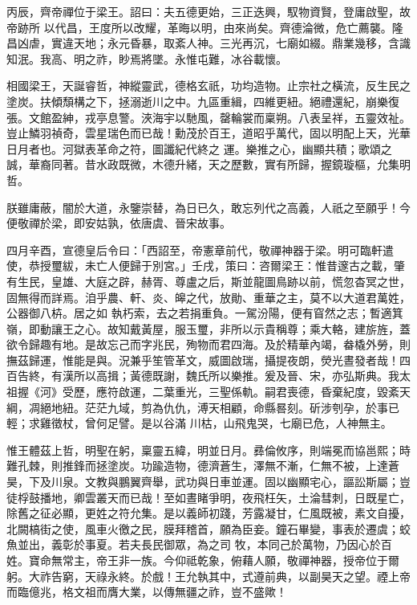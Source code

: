 \begin{pinyinscope}
 丙辰，齊帝禪位于梁王。詔曰：夫五德更始，三正迭興，馭物資賢，登庸啟聖，故帝跡所
 以代昌，王度所以改耀，革晦以明，由來尚矣。齊德淪微，危亡薦襲。隆昌凶虐，實違天地；永元昏暴，取紊人神。三光再沉，七廟如綴。鼎業幾移，含識知泯。我高、明之祚，眇焉將墜。永惟屯難，冰谷載懷。



 相國梁王，天誕睿哲，神縱靈武，德格玄祇，功均造物。止宗社之橫流，反生民之塗炭。扶傾頹構之下，拯溺逝川之中。九區重緝，四維更紐。絕禮還紀，崩樂復張。文館盈紳，戎亭息警。浹海宇以馳風，罄輪裳而稟朔。八表呈祥，五靈效祉。豈止鱗羽禎奇，雲星瑞色而已哉！勳茂於百王，道昭乎萬代，固以明配上天，光華日月者也。河獄表革命之符，圖讖紀代終之
 運。樂推之心，幽顯共積；歌頌之誠，華裔同著。昔水政既微，木德升緒，天之歷數，實有所歸，握鏡璇樞，允集明哲。



 朕雖庸蔽，闇於大道，永鑒崇替，為日已久，敢忘列代之高義，人祇之至願乎！今便敬禪於梁，即安姑孰，依唐虞、晉宋故事。



 四月辛酉，宣德皇后令曰：「西詔至，帝憲章前代，敬禪神器于梁。明可臨軒遣使，恭授璽紱，未亡人便歸于別宮。」壬戌，策曰：咨爾梁王：惟昔邃古之載，肇有生民，皇雄、大庭之辟，赫胥、尊盧之后，斯並龍圖鳥跡以前，慌忽杳冥之世，固無得而詳焉。洎乎農、軒、炎、皞之代，放勛、重華之主，莫不以大道君萬姓，公器御八枿。居之如
 執朽索，去之若捐重負。一駕汾陽，便有窅然之志；暫適箕嶺，即動讓王之心。故知戴黃屋，服玉璽，非所以示貴稱尊；乘大輅，建旂旌，蓋欲令歸趣有地。是故忘己而字兆民，殉物而君四海。及於精華內竭，畚橇外勞，則撫茲歸運，惟能是與。況兼乎笙管革文，威圖啟瑞，攝提夜朗，熒光晝發者哉！四百告終，有漢所以高揖；黃德既謝，魏氏所以樂推。爰及晉、宋，亦弘斯典。我太祖握《河》受歷，應符啟運，二葉重光，三聖係軌。嗣君喪德，昏棄紀度，毀紊天綱，凋絕地紐。茫茫九域，剪為仇仇，溥天相顧，命縣晷刻。斫涉刳孕，於事已輕；求雞徵杖，曾何足譬。是以谷滿
 川枯，山飛鬼哭，七廟已危，人神無主。



 惟王體茲上哲，明聖在躬，稟靈五緯，明並日月。彞倫攸序，則端冕而協邕熙；時難孔棘，則推鋒而拯塗炭。功踰造物，德濟蒼生，澤無不漸，仁無不被，上達蒼昊，下及川泉。文教與鵬翼齊舉，武功與日車並運。固以幽顯宅心，謳訟斯屬；豈徒桴鼓播地，卿雲叢天而已哉！至如晝睹爭明，夜飛枉矢，土淪彗刺，日既星亡，除舊之征必顯，更姓之符允集。是以義師初踐，芳露凝甘，仁風既被，素文自擾，北闕槁街之使，風車火徼之民，膜拜稽首，願為臣妾。鐘石畢變，事表於遷虞；蛟魚並出，義彰於事夏。若夫長民御眾，為之司
 牧，本同己於萬物，乃因心於百姓。寶命無常主，帝王非一族。今仰祗乾象，俯藉人願，敬禪神器，授帝位于爾躬。大祚告窮，天祿永終。於戲！王允執其中，式遵前典，以副昊天之望。禋上帝而臨億兆，格文祖而膺大業，以傳無疆之祚，豈不盛歟！




\end{pinyinscope}
